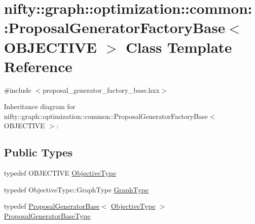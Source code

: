 \hypertarget{classnifty_1_1graph_1_1optimization_1_1common_1_1ProposalGeneratorFactoryBase}{}\section{nifty\+:\+:graph\+:\+:optimization\+:\+:common\+:\+:Proposal\+Generator\+Factory\+Base$<$ O\+B\+J\+E\+C\+T\+I\+V\+E $>$ Class Template Reference}
\label{classnifty_1_1graph_1_1optimization_1_1common_1_1ProposalGeneratorFactoryBase}


{\ttfamily \#include $<$proposal\+\_\+generator\+\_\+factory\+\_\+base.\+hxx$>$}



Inheritance diagram for nifty\+:\+:graph\+:\+:optimization\+:\+:common\+:\+:Proposal\+Generator\+Factory\+Base$<$ O\+B\+J\+E\+C\+T\+I\+V\+E $>$\+:
\subsection*{Public Types}
\begin{DoxyCompactItemize}
\item 
typedef O\+B\+J\+E\+C\+T\+I\+V\+E \hyperlink{classnifty_1_1graph_1_1optimization_1_1common_1_1ProposalGeneratorFactoryBase_aa5736d89b93a428099cc2f867266c8c7}{Objective\+Type}
\item 
typedef Objective\+Type\+::\+Graph\+Type \hyperlink{classnifty_1_1graph_1_1optimization_1_1common_1_1ProposalGeneratorFactoryBase_afbc5ea0723729b327417d43729cdf084}{Graph\+Type}
\item 
typedef \hyperlink{classnifty_1_1graph_1_1optimization_1_1common_1_1ProposalGeneratorBase}{Proposal\+Generator\+Base}$<$ \hyperlink{classnifty_1_1graph_1_1optimization_1_1common_1_1ProposalGeneratorFactoryBase_aa5736d89b93a428099cc2f867266c8c7}{Objective\+Type} $>$ \hyperlink{classnifty_1_1graph_1_1optimization_1_1common_1_1ProposalGeneratorFactoryBase_ac2be47e9c7b7a249b3d597831c50405d}{Proposal\+Generator\+Base\+Type}
\end{DoxyCompactItemize}
